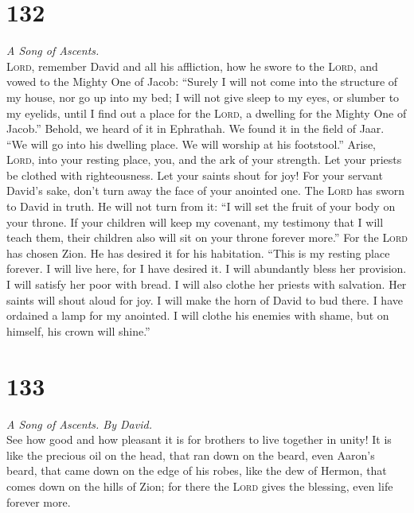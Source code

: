 \hypertarget{section-131}{%
\section{132}\label{section-131}}

\emph{A Song of Ascents.}\\
 \textsc{Lord}, remember David and all his affliction,
 how he swore to the \textsc{Lord}, and vowed to the
Mighty One of Jacob:  ``Surely I will not come into the
structure of my house, nor go up into my bed;  I will not
give sleep to my eyes, or slumber to my eyelids,  until I
find out a place for the \textsc{Lord}, a dwelling for the Mighty One of
Jacob.''  Behold, we heard of it in Ephrathah. We found it
in the field of Jaar.  ``We will go into his dwelling
place. We will worship at his footstool.''  Arise,
\textsc{Lord}, into your resting place, you, and the ark of your
strength.  Let your priests be clothed with righteousness.
Let your saints shout for joy!  For your servant David's
sake, don't turn away the face of your anointed one.  The
\textsc{Lord} has sworn to David in truth. He will not turn from it: ``I
will set the fruit of your body on your throne.  If your
children will keep my covenant, my testimony that I will teach them,
their children also will sit on your throne forever more.''
 For the \textsc{Lord} has chosen Zion. He has desired it
for his habitation.  ``This is my resting place forever.
I will live here, for I have desired it.  I will
abundantly bless her provision. I will satisfy her poor with bread.
 I will also clothe her priests with salvation. Her
saints will shout aloud for joy.  I will make the horn of
David to bud there. I have ordained a lamp for my anointed.
 I will clothe his enemies with shame, but on himself,
his crown will shine.''

\hypertarget{section-132}{%
\section{133}\label{section-132}}

\emph{A Song of Ascents. By David.}\\
 See how good and how pleasant it is for brothers to live
together in unity!  It is like the precious oil on the
head, that ran down on the beard, even Aaron's beard, that came down on
the edge of his robes,  like the dew of Hermon, that comes
down on the hills of Zion; for there the \textsc{Lord} gives the
blessing, even life forever more.

